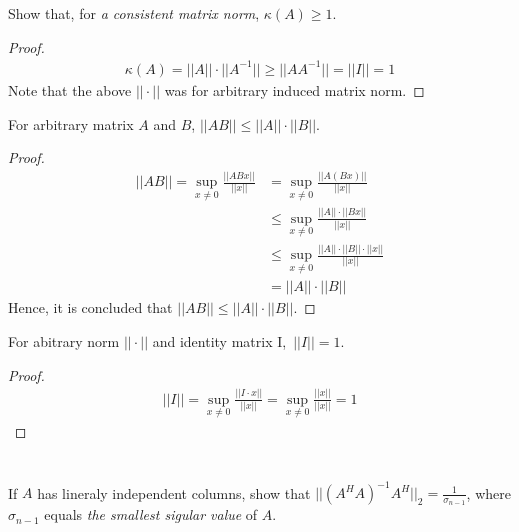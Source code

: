 \documentclass[11pt,a4paper]{article}
\begin{document}
\section{}
Show that, for {\it a consistent matrix norm}, $\kappa(A) \geq 1$.

\begin{proof}
\begin{align}
    \kappa(A) = ||A|| \cdot ||A^{-1}|| \geq || A A^{-1}|| = ||I|| = 1
\end{align}
Note that the above $||\cdot||$ was for arbitrary induced matrix norm.
\end{proof}

\begin{lemma}
    For arbitrary matrix $A$ and $B$, $|| AB || \leq || A || \cdot || B ||$.
\end{lemma}
\begin{proof}
    \begin{align}
        || A B || = \sup_{x \not =0} \frac{|| A B x ||}{|| x ||} 
        &= \sup_{x \not =0} \frac{|| A (B x) ||}{|| x ||} \\ 
        &\leq \sup_{x \not =0} \frac{|| A || \cdot || B x ||}{|| x ||} \\
        &\leq \sup_{x \not =0} \frac{|| A || \cdot || B || \cdot || x || }{|| x ||} \\
        &= || A || \cdot || B || 
\end{align}
Hence, it is concluded that $|| A B || \leq || A || \cdot || B ||$.
\end{proof}

\begin{lemma}
    For abitrary norm $|| \cdot ||$ and identity matrix I,\ $|| I || = 1$.
\end{lemma}
\begin{proof}
    \begin{align}
        || I || = \sup_{x\not =0} \frac{|| I \cdot x ||}{|| x ||} 
        = \sup_{x\not =0} \frac{|| x ||}{|| x ||} 
        = 1
    \end{align}
\end{proof}

\newpage
\section{}
If $A$ has lineraly independent columns, show that 
$|| (A^H A)^{-1} A^H ||_2 = \frac{1}{\sigma_{n-1}}$, where $\sigma_{n-1}$
equals {\it the smallest sigular value} of $A$. 
\end{document}
